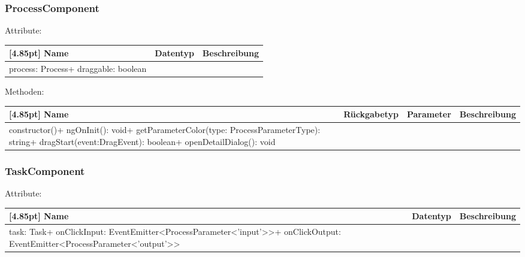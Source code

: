         	\subsubsection{ProcessComponent}
        	
        	    Attribute:
                \begin{center}
                	\renewcommand{\arraystretch}{1.5}
                    \setlength\tabcolsep{5pt}
                	\begin{tabularx}{\textwidth}{|l|l|X|}
                		\hline
                        \rowcolor[gray]{0.75}[4.85pt]            		
                        Name & Datentyp & Beschreibung \\ \hline
                        process: Process+ draggable: boolean
                        & &  \\ \hline
                	\end{tabularx}
                \end{center}
                
                Methoden:
        		\begin{center}
                \setlength\tabcolsep{5pt}
                	\renewcommand{\arraystretch}{1.5}
                    	\begin{tabularx}{\textwidth}{|l|l|l|X|}
                    	\hline
                    	\rowcolor[gray]{0.75}[4.85pt]
                		Name & Rückgabetyp & Parameter & Beschreibung \\ \hline
                		constructor()+ ngOnInit(): void+ getParameterColor(type: ProcessParameterType): string+ dragStart(event:DragEvent): boolean+ openDetailDialog(): void
                        & & &  \\ \hline
                        \end{tabularx}
        		\end{center}
        	
        	\subsubsection{TaskComponent}
        	
        	    Attribute:
                \begin{center}
                	\renewcommand{\arraystretch}{1.5}
                    \setlength\tabcolsep{5pt}
                	\begin{tabularx}{\textwidth}{|l|l|X|}
                		\hline
                        \rowcolor[gray]{0.75}[4.85pt]            		
                        Name & Datentyp & Beschreibung \\ \hline
                        task: Task+ onClickInput: EventEmitter<ProcessParameter<'input'>>+ onClickOutput: EventEmitter<ProcessParameter<'output'>>
                        & &  \\ \hline
                	\end{tabularx}
                \end{center}
                
